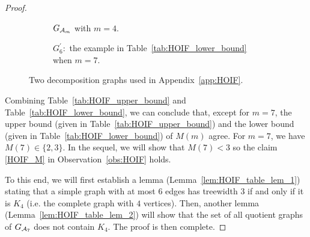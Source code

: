 \documentclass[letterpaper,11pt]{article}
\newcommand{\completegraphp}[1]{K_{#1}}
\newcommand{\graphform}[1]{G_{#1}}
\begin{document}
\begin{bibunit}[plainnat]
\begin{proof}
\begin{figure}[h!]
    \centering
    \begin{subfigure}{0.45\textwidth}
        \centering
        \caption{$\graphform{\calA_m}$ with $m=4$.}
        \label{fig:hoif_graph_m}
    \end{subfigure}
    \hfill
    \begin{subfigure}{0.45\textwidth}
        \centering
        \caption{$G^{\prime}_6:$ the example in Table~\ref{tab:HOIF_lower_bound} when $m=7$.}
        \label{fig:graph_e_6_hoif}
    \end{subfigure}
    \caption{Two decomposition graphs used in Appendix~\ref{app:HOIF}.}
\end{figure}

Combining Table~\ref{tab:HOIF_upper_bound} and Table~\ref{tab:HOIF_lower_bound}, we can conclude that, except for $m = 7$, the upper bound (given in Table~\ref{tab:HOIF_upper_bound}) and the lower bound (given in Table~\ref{tab:HOIF_lower_bound}) of $M (m)$ agree. For $m = 7$, we have $M (7) \in \{2, 3\}$. In the sequel, we will show that $M (7) < 3$ so the claim \eqref{HOIF_M} in Observation~\ref{obs:HOIF} holds.

To this end, we will first establish a lemma (Lemma~\ref{lem:HOIF_table_lem_1}) stating that a simple graph with at most $6$ edges has treewidth $3$ if and only if it is $\completegraphp{4}$ (i.e. the complete graph with $4$ vertices). Then, another lemma (Lemma~\ref{lem:HOIF_table_lem_2}) will show that the set of all quotient graphs of $\graphform{\calA_7}$ does not contain $\completegraphp{4}$. The proof is then complete.
\end{proof}


\end{bibunit}
\end{document}
